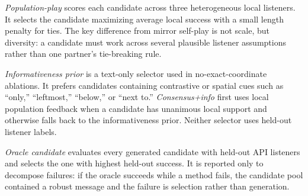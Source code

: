 \emph{Population-play} scores each candidate across three heterogeneous local listeners. It selects the candidate maximizing average local success with a small length penalty for ties. The key difference from mirror self-play is not scale, but diversity: a candidate must work across several plausible listener assumptions rather than one partner's tie-breaking rule.

\emph{Informativeness prior} is a text-only selector used in no-exact-coordinate ablations. It prefers candidates containing contrastive or spatial cues such as ``only,'' ``leftmost,'' ``below,'' or ``next to.'' \emph{Consensus+info} first uses local population feedback when a candidate has unanimous local support and otherwise falls back to the informativeness prior. Neither selector uses held-out listener labels.

\emph{Oracle candidate} evaluates every generated candidate with held-out API listeners and selects the one with highest held-out success. It is reported only to decompose failures: if the oracle succeeds while a method fails, the candidate pool contained a robust message and the failure is selection rather than generation.
